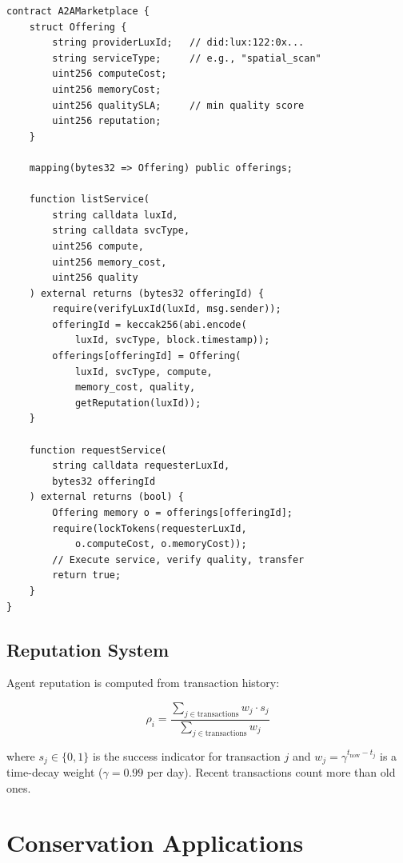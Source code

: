 \documentclass[11pt,letterpaper]{article}
\begin{document}
\begin{lstlisting}[language=Solidity,caption=A2A service marketplace]
contract A2AMarketplace {
    struct Offering {
        string providerLuxId;   // did:lux:122:0x...
        string serviceType;     // e.g., "spatial_scan"
        uint256 computeCost;
        uint256 memoryCost;
        uint256 qualitySLA;     // min quality score
        uint256 reputation;
    }

    mapping(bytes32 => Offering) public offerings;

    function listService(
        string calldata luxId,
        string calldata svcType,
        uint256 compute,
        uint256 memory_cost,
        uint256 quality
    ) external returns (bytes32 offeringId) {
        require(verifyLuxId(luxId, msg.sender));
        offeringId = keccak256(abi.encode(
            luxId, svcType, block.timestamp));
        offerings[offeringId] = Offering(
            luxId, svcType, compute,
            memory_cost, quality,
            getReputation(luxId));
    }

    function requestService(
        string calldata requesterLuxId,
        bytes32 offeringId
    ) external returns (bool) {
        Offering memory o = offerings[offeringId];
        require(lockTokens(requesterLuxId,
            o.computeCost, o.memoryCost));
        // Execute service, verify quality, transfer
        return true;
    }
}
\end{lstlisting}

\subsection{Reputation System}

Agent reputation is computed from transaction history:

\begin{equation}
\rho_i = \frac{\sum_{j \in \text{transactions}} w_j \cdot s_j}{\sum_{j \in \text{transactions}} w_j}
\label{eq:reputation}
\end{equation}

where $s_j \in \{0, 1\}$ is the success indicator for transaction $j$ and $w_j = \gamma^{t_{\text{now}} - t_j}$ is a time-decay weight ($\gamma = 0.99$ per day). Recent transactions count more than old ones.

\section{Conservation Applications}
\end{document}
